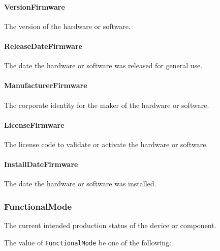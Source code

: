 \paragraph{VersionFirmware}\mbox{}
\label{sec:VersionFirmware}



The version of the hardware or software.


\paragraph{ReleaseDateFirmware}\mbox{}
\label{sec:ReleaseDateFirmware}



The date the hardware or software was released for general use.



\paragraph{ManufacturerFirmware}\mbox{}
\label{sec:ManufacturerFirmware}



The corporate identity for the maker of the hardware or software.



\paragraph{LicenseFirmware}\mbox{}
\label{sec:LicenseFirmware}



The license code to validate or activate the hardware or software.


\paragraph{InstallDateFirmware}\mbox{}
\label{sec:InstallDateFirmware}



The date the hardware or software was installed.


\subsubsection{FunctionalMode}
\label{sec:FunctionalMode}



The current intended production status of the device or component.


The value of \texttt{FunctionalMode} \MUST be one of the following: 


